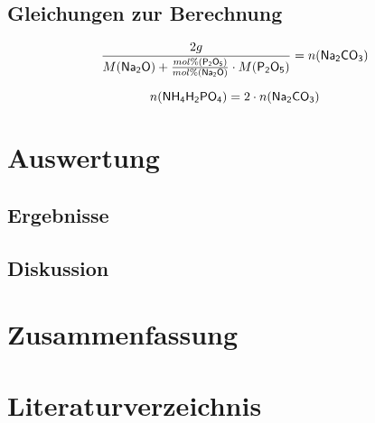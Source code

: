 \documentclass[12pt, a4paper]{article}
\begin{document}
\subsection{Gleichungen zur Berechnung}
\begin{equation}
  \frac{2 g}{M(\ce{Na2O})+\frac{mol\%  (\ce{P2O5})}{mol\%  (\ce{Na2O})}\cdot M(\ce{P2O5})}= n(\ce{Na2CO3})
\end{equation}

\begin{equation}
  n(\ce{NH4H2PO4})= 2 \cdot n(\ce{Na2CO3})
\end{equation}



\newpage
\section{Auswertung}
\subsection{Ergebnisse}
\subsection{Diskussion}



\newpage
\section{Zusammenfassung}




\newpage
\section{Literaturverzeichnis}
\printbibliography
\end{document}
